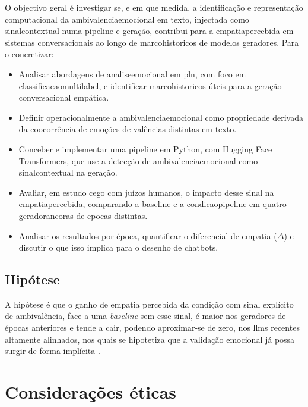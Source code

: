\label{sec:objetivo_geral}
O objectivo geral é investigar se, e em que medida, a identificação e representação computacional da \gls{ambivalenciaemocional} em texto, injectada como \gls{sinalcontextual} numa \gls{pipeline} e geração, contribui para a \gls{empatiapercebida} em sistemas conversacionais ao longo de \glspl{marcohistorico} de modelos geradores. Para o concretizar:

\begin{itemize}
 \item Analisar abordagens de \gls{analiseemocional} em \gls{pln}, com foco em \gls{classificacaomultilabel}, e identificar \glspl{marcohistorico} úteis para a geração conversacional empática.
 \item Definir operacionalmente a \gls{ambivalenciaemocional} como propriedade derivada da coocorrência de emoções de valências distintas em texto.
 \item Conceber e implementar uma \gls{pipeline} em Python, com Hugging Face Transformers, que use a detecção de \gls{ambivalenciaemocional} como \gls{sinalcontextual} na geração.
 \item Avaliar, em estudo cego com juízos humanos, o impacto desse sinal na \gls{empatiapercebida}, comparando a \gls{baseline} e a \gls{condicaopipeline} em quatro \glspl{geradorancora} de \glspl{epoca} distintas.
 \item Analisar os resultados por época, quantificar o diferencial de empatia (\(\Delta\)) e discutir o que isso implica para o desenho de chatbots.
\end{itemize}

\subsection{Hipótese}
\label{sec:hipotese}

A hipótese é que o ganho de empatia percebida da condição com sinal explícito de ambivalência, face a uma \textit{baseline} sem esse sinal, é maior nos geradores de épocas anteriores e tende a cair, podendo aproximar-se de zero, nos \glspl{llm} recentes altamente alinhados, nos quais se hipotetiza que a validação emocional já possa surgir de forma implícita \parencite{Bieberstein2026PromptEmpathy}.


\section{Considerações éticas}
\label{sec:consideracoes_eticas}

